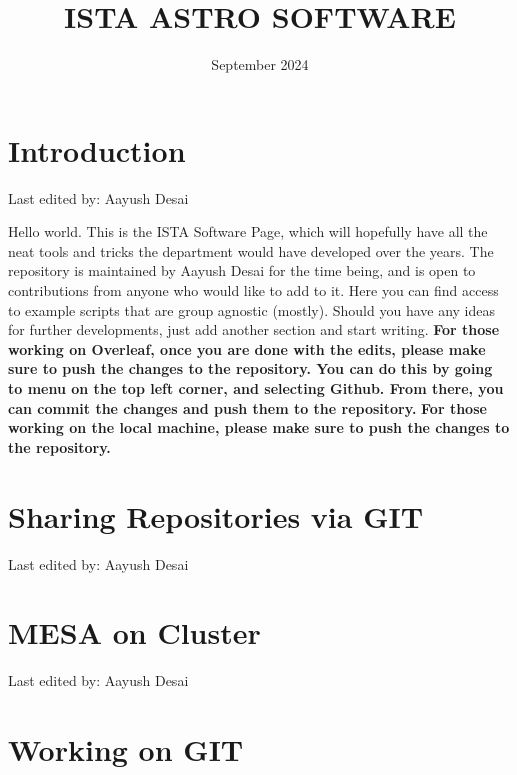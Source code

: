 \documentclass{article}
\title{ISTA ASTRO SOFTWARE}
\date{September 2024}
\newcommand{\setlasteditor}[1]{\gdef\lasteditor{#1}}
\newcommand{\lastedited}{%
    \vspace{1mm} {\footnotesize Last edited by: \lasteditor} \vspace{3mm}
    \newline

}
\begin{document}
\maketitle


\tableofcontents
\newpage
\section*{Introduction}
\setlasteditor{Aayush Desai}
\lastedited
\noindent
Hello world. This is the ISTA Software Page, which will hopefully have all the neat tools and tricks the department would have developed over the years. The repository is maintained by Aayush Desai for the time being, and is open to contributions from anyone who would like to add to it.
\newline
\noindent
Here you can find access to example scripts that are group agnostic (mostly). Should you have any ideas for further developments, just add another section and start writing.
\newline
\newline
\textbf{For those working on Overleaf, once you are done with the edits, please make sure to push the changes to the repository. You can do this by going to menu on the top left corner, and selecting Github. From there, you can commit the changes and push them to the repository.}
\newline
\newline
\textbf{For those working on the local machine, please make sure to push the changes to the repository.}
\section{Sharing Repositories via GIT}
\setlasteditor{Aayush Desai}
\lastedited

\section{MESA on Cluster}
\setlasteditor{Aayush Desai}
\lastedited

\section{Working on GIT}
\end{document}
